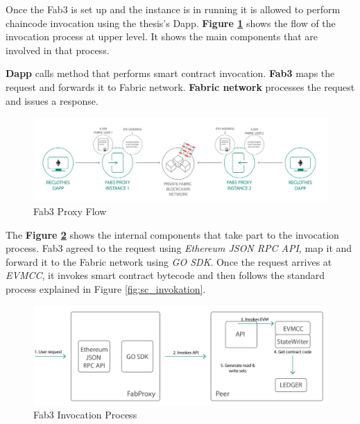 Once the Fab3 is set up and the instance is in running it is allowed to perform chaincode invocation using the 
thesis's Dapp. \textbf{Figure \ref{fig:fab3_flow}} shows the flow of the invocation process at upper level. 
It shows the main components that are involved in that process. 

\begin{outline}[enumerate]
    \1 \textbf{Dapp} calls method that performs smart contract invocation.
    \1 \textbf{Fab3} maps the request and forwards it to Fabric network.
    \1 \textbf{Fabric network} processes the request and issues a response.
\end{outline}

\begin{figure}[h!]
    \centering
    \includegraphics[totalheight=5cm]{img/fab3_flow.png}
    \caption{Fab3 Proxy Flow}
    \label{fig:fab3_flow}
\end{figure}

The \textbf{Figure \ref{fig:fab3_invokation}} shows the internal components that take part to the invocation process. 
Fab3 agreed to the request using \textit{Ethereum JSON RPC API}, map it and forward it to the Fabric network using 
\textit{GO SDK}. Once the request arrives at \textit{EVMCC}, it invokes smart contract bytecode and then follows the 
standard process explained in Figure \ref{fig:sc_invokation}.

\begin{figure}[h!]
    \centering
    \includegraphics[totalheight=5cm]{img/fab3_invokation.png}
    \caption{Fab3 Invocation Process}
    \label{fig:fab3_invokation}
\end{figure}


